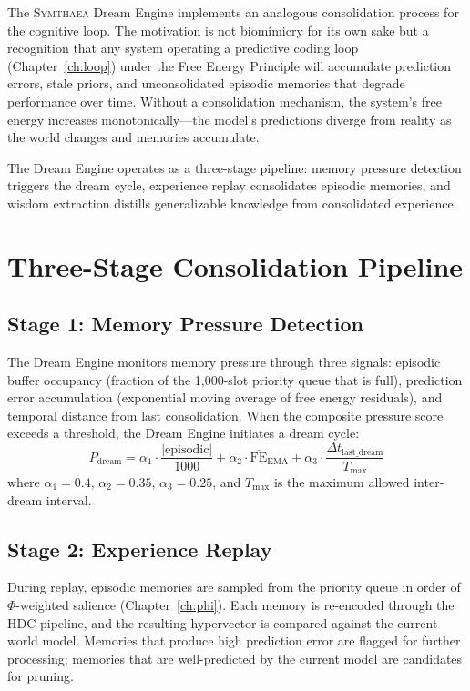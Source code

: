 \documentclass[12pt]{book}
\newcommand{\symthaea}{\textsc{Symthaea}}
\begin{document}
The \symthaea{} Dream Engine implements an analogous consolidation process for the cognitive loop. The motivation is not biomimicry for its own sake but a recognition that any system operating a predictive coding loop (Chapter~\ref{ch:loop}) under the Free Energy Principle will accumulate prediction errors, stale priors, and unconsolidated episodic memories that degrade performance over time. Without a consolidation mechanism, the system's free energy increases monotonically---the model's predictions diverge from reality as the world changes and memories accumulate.

The Dream Engine operates as a three-stage pipeline: memory pressure detection triggers the dream cycle, experience replay consolidates episodic memories, and wisdom extraction distills generalizable knowledge from consolidated experience.

\section{Three-Stage Consolidation Pipeline}

\subsection{Stage 1: Memory Pressure Detection}

The Dream Engine monitors memory pressure through three signals: episodic buffer occupancy (fraction of the 1,000-slot priority queue that is full), prediction error accumulation (exponential moving average of free energy residuals), and temporal distance from last consolidation. When the composite pressure score exceeds a threshold, the Dream Engine initiates a dream cycle:
\begin{equation}
P_{\text{dream}} = \alpha_1 \cdot \frac{|\text{episodic}|}{1000} + \alpha_2 \cdot \overline{\text{FE}}_{\text{EMA}} + \alpha_3 \cdot \frac{\Delta t_{\text{last\_dream}}}{T_{\text{max}}}
\end{equation}
where $\alpha_1 = 0.4$, $\alpha_2 = 0.35$, $\alpha_3 = 0.25$, and $T_{\text{max}}$ is the maximum allowed inter-dream interval.

\subsection{Stage 2: Experience Replay}

During replay, episodic memories are sampled from the priority queue in order of $\Phi$-weighted salience (Chapter~\ref{ch:phi}). Each memory is re-encoded through the HDC pipeline, and the resulting hypervector is compared against the current world model. Memories that produce high prediction error are flagged for further processing; memories that are well-predicted by the current model are candidates for pruning.
\end{document}
